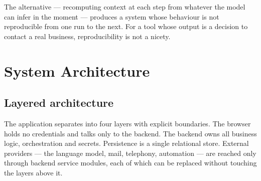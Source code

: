 \documentclass[11pt,a4paper]{report}
\begin{document}
The alternative --- recomputing context at each step from whatever the model can infer in the moment --- produces a system whose behaviour is not reproducible from one run to the next. For a tool whose output is a decision to contact a real business, reproducibility is not a nicety.

\chapter{System Architecture}
\section{Layered architecture}
The application separates into four layers with explicit boundaries. The browser holds no credentials and talks only to the backend. The backend owns all business logic, orchestration and secrets. Persistence is a single relational store. External providers --- the language model, mail, telephony, automation --- are reached only through backend service modules, each of which can be replaced without touching the layers above it.
\end{document}
